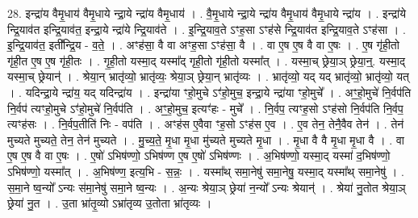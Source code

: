 \documentclass[17pt]{extarticle}
\begin{document}
28. इन्द्रा॑य वैमृ॒धाय॑ वैमृ॒धाये न्द्रा॒ये न्द्रा॑य वैमृ॒धाय॑ । . वै॒मृ॒धाये न्द्रा॒ये न्द्रा॑य वैमृ॒धाय॑ वैमृ॒धाये न्द्रा॑य । . इन्द्रा॑ये न्द्रि॒याव॑त इन्द्रि॒याव॑त॒ इन्द्रा॒ये न्द्रा॑ये न्द्रि॒याव॑ते । . इ॒न्द्रि॒याव॒ते ऽꣳह॒सा ऽꣳह॑से न्द्रि॒याव॑त इन्द्रि॒याव॒ते ऽꣳह॑सा । . इ॒न्द्रि॒याव॑त॒ इती᳚न्द्रि॒य - व॒ते॒ । . अꣳह॑सा॒ वै वा अꣳह॒सा ऽꣳह॑सा॒ वै । . वा ए॒ष ए॒ष वै वा ए॒षः । . ए॒ष गृ॑ही॒तो गृ॑ही॒त ए॒ष ए॒ष गृ॑ही॒तः । . गृ॒ही॒तो यस्मा॒द् यस्मा᳚द् गृही॒तो गृ॑ही॒तो यस्मा᳚त् । . यस्मा॒च् छ्रेया॒ञ् छ्रेया॒न्॒. यस्मा॒द् यस्मा॒च् छ्रेयान्॑ । . श्रेया॒न् भ्रातृ॑व्यो॒ भ्रातृ॑व्यः॒ श्रेया॒ञ् छ्रेया॒न् भ्रातृ॑व्यः । . भ्रातृ॑व्यो॒ यद् यद् भ्रातृ॑व्यो॒ भ्रातृ॑व्यो॒ यत् । . यदिन्द्रा॒ये न्द्रा॑य॒ यद् यदिन्द्रा॑य । . इन्द्रा॑या ꣳहो॒मुचे ऽꣳ॑हो॒मुच॒ इन्द्रा॒ये न्द्रा॑या ꣳहो॒मुचे᳚ । . अꣳ॒॒हो॒मुचे॑ नि॒र्वप॑ति नि॒र्वप॑ त्यꣳहो॒मुचे ऽꣳ॑हो॒मुचे॑ नि॒र्वप॑ति । . अꣳ॒॒हो॒मुच॒ इत्यꣳ॑हः - मुचे᳚ । . नि॒र्वप॒ त्यꣳह॒सो ऽꣳह॑सो नि॒र्वप॑ति नि॒र्वप॒ त्यꣳह॑सः । . नि॒र्वप॒तीति॑ निः - वप॑ति । . अꣳह॑स ए॒वैवा ꣳह॒सो ऽꣳह॑स ए॒व । . ए॒व तेन॒ तेनै॒वैव तेन॑ । . तेन॑ मुच्यते मुच्यते॒ तेन॒ तेन॑ मुच्यते । . मु॒च्य॒ते॒ मृ॒धा मृ॒धा मु॑च्यते मुच्यते मृ॒धा । . मृ॒धा वै वै मृ॒धा मृ॒धा वै । . वा ए॒ष ए॒ष वै वा ए॒षः । . ए॒षो॑ ऽभिष॑ण्णो॒ ऽभिष॑ण्ण ए॒ष ए॒षो॑ ऽभिष॑ण्णः । . अ॒भिष॑ण्णो॒ यस्मा॒द् यस्मा॑ द॒भिष॑ण्णो॒ ऽभिष॑ण्णो॒ यस्मा᳚त् । . अ॒भिष॑ण्ण॒ इत्य॒भि - स॒न्नः॒ । . यस्मा᳚थ् समा॒नेषु॑ समा॒नेषु॒ यस्मा॒द् यस्मा᳚थ् समा॒नेषु॑ । . स॒मा॒ने ष्व॒न्यो᳚ ऽन्यः स॑मा॒नेषु॑ समा॒ने ष्व॒न्यः । . अ॒न्यः श्रेया॒ञ् छ्रेया॑ न॒न्यो᳚ ऽन्यः श्रेयान्॑ । . श्रेया॑ नु॒तोत श्रेया॒ञ् छ्रेया॑ नु॒त । . उ॒ता भ्रा॑तृ॒व्यो ऽभ्रा॑तृव्य उ॒तोता भ्रा॑तृव्यः । \newline
\end{document}
